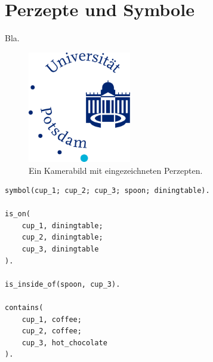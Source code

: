 \section{Perzepte und Symbole}
\label{sec:Test/Perzepte_und_Symbole}
Bla.


\begin{figure}
    \centering
    \includegraphics[width=0.4\textwidth]{gfx/unilogo.jpg}
    \caption{Ein Kamerabild mit eingezeichneten Perzepten.}
    \label{fig:cups_yolo}
\end{figure}


\begin{lstlisting}[float,caption={Eine symbolische Beschreibung der Objekte in bla.},label=lst:cups_symbolic]
symbol(cup_1; cup_2; cup_3; spoon; diningtable).

is_on(
    cup_1, diningtable;
    cup_2, diningtable;
    cup_3, diningtable
).

is_inside_of(spoon, cup_3).

contains(
    cup_1, coffee;
    cup_2, coffee;
    cup_3, hot_chocolate
).

\end{lstlisting}



